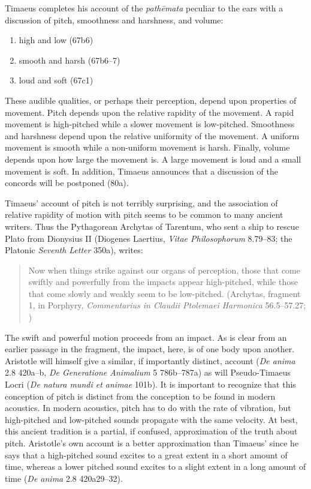 Timaeus completes his account of the \emph{pathēmata} peculiar to the ears with a discussion of pitch, smoothness and harshness, and volume:
\begin{enumerate}
	\item high and low (67b6)
	\item smooth and harsh (67b6--7)
	\item loud and soft (67c1)
\end{enumerate}
These audible qualities, or perhaps their perception, depend upon properties of movement. Pitch depends upon the relative rapidity of the movement. A rapid movement is high-pitched while a slower movement is low-pitched. Smoothness and harshness depend upon the relative uniformity of the movement. A uniform movement is smooth while a non-uniform movement is harsh. Finally, volume depends upon how large the movement is. A large movement is loud and a small movement is soft. In addition, Timaeus announces that a discussion of the concords will be postponed (80a).

Timaeus' account of pitch is not terribly surprising, and the association of relative rapidity of motion with pitch seems to be common to many ancient writers. Thus the Pythagorean Archytas of Tarentum, who sent a ship to rescue Plato from Dionysius II (Diogenes Laertius, \emph{Vitae Philosophorum} 8.79--83; the Platonic \emph{Seventh Letter} 350a), writes:
\begin{quote}
	Now when things strike against our organs of perception, those that come swiftly and powerfully from the impacts appear high-pitched, while those that come slowly and weakly seem to be low-pitched. (Archytas, fragment 1, in Porphyry, \emph{Commentarius in Claudii Ptolemaei Harmonica} 56.5--57.27; \citealt[41]{Barker:1989pi})
\end{quote}
The swift and powerful motion proceeds from an impact. As is clear from an earlier passage in the fragment, the impact, here, is of one body upon another. Aristotle will himself give a similar, if importantly distinct, account (\emph{De anima} 2.8 420a--b, \emph{De Generatione Animalium} 5 786b--787a) as will Pseudo-Timaeus Locri (\emph{De natura mundi et animae} 101b). It is important to recognize that this conception of pitch is distinct from the conception to be found in modern acoustics. In modern acoustics, pitch has to do with the rate of vibration, but high-pitched and low-pitched sounds propagate with the same velocity. At best, this ancient tradition is a partial, if confused, approximation of the truth about pitch. Aristotle's own account is a better approximation than Timaeus' since he says that a high-pitched sound excites to a great extent in a short amount of time, whereas a lower pitched sound excites to a slight extent in a long amount of time (\emph{De anima} 2.8 420a29--32).


